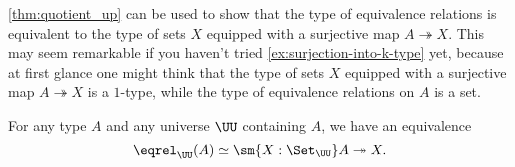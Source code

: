 \cref{thm:quotient_up} can be used to show that the type of equivalence relations is equivalent to the type of sets $X$ equipped with a surjective map $A\twoheadrightarrow X$. This may seem remarkable if you haven't tried \cref{ex:surjection-into-k-type} yet, because at first glance one might think that the type of sets $X$ equipped with a surjective map $A\twoheadrightarrow X$ is a $1$-type, while the type of equivalence relations on $A$ is a set.

\begin{thm}\label{thm:eqrel-surj}
  For any type $A$ and any universe $\UU$ containing $A$, we have an equivalence
  \begin{equation*}
    \eqrel_\UU(A)\simeq\sm{X:\Set_\UU}A\twoheadrightarrow X.
  \end{equation*}
\end{thm}

